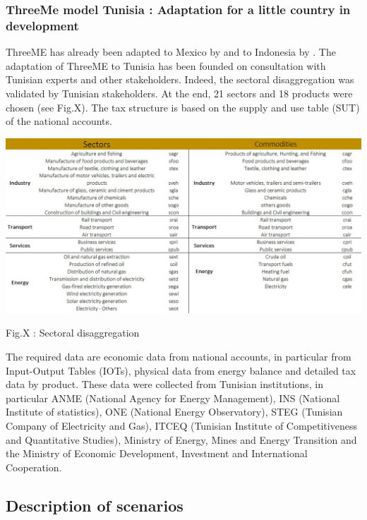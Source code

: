 \documentclass[
]{article}
\begin{document}
\hypertarget{threeme-model-tunisia-adaptation-for-a-little-country-in-development}{%
\subsubsection{ThreeMe model Tunisia : Adaptation for a little country
in
development}\label{threeme-model-tunisia-adaptation-for-a-little-country-in-development}}

ThreeME has already been adapted to Mexico by \textcite{landarivera2016}
and to Indonesia by \textcite{reynes2017}. The adaptation of ThreeME to
Tunisia has been founded on consultation with Tunisian experts and other
stakeholders. Indeed, the sectoral disaggregation was validated by
Tunisian stakeholders. At the end, 21 sectors and 18 products were
chosen (see Fig.X). The tax structure is based on the supply and use
table (SUT) of the national accounts.

\includegraphics{Images/Sectoral disaggregation.jpg}

Fig.X : Sectoral disaggregation

The required data are economic data from national accounts, in
particular from Input-Output Tables (IOTs), physical data from energy
balance and detailed tax data by product. These data were collected from
Tunisian institutions, in particular ANME (National Agency for Energy
Management), INS (National Institute of statistics), ONE (National
Energy Observatory), STEG (Tunisian Company of Electricity and Gas),
ITCEQ (Tunisian Institute of Competitiveness and Quantitative Studies),
Ministry of Energy, Mines and Energy Transition and the Ministry of
Economic Development, Investment and International Cooperation.

\hypertarget{description-of-scenarios}{%
\subsection{Description of scenarios}\label{description-of-scenarios}}
\end{document}
